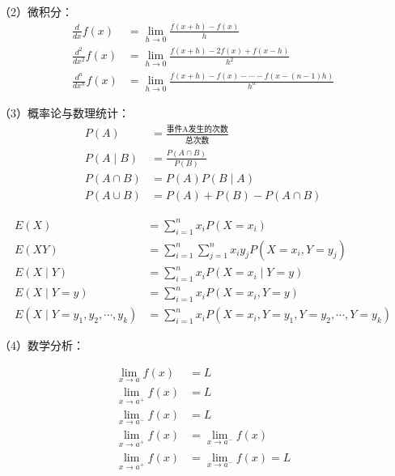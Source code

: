 \begin{ujnbody}
    （2）微积分：
    \begin{equation}
        \begin{split}
            \frac{d}{dx}f(x) &= \lim_{h \to 0}\frac{f(x+h)-f(x)}{h} \\
            \frac{d^2}{dx^2}f(x) &= \lim_{h \to 0}\frac{f(x+h)-2f(x)+f(x-h)}{h^2} \\
            \frac{d^n}{dx^n}f(x) &= \lim_{h \to 0}\frac{f(x+h)-f(x)-\cdots-f(x-(n-1)h)}{h^n}
        \end{split}
        \label{eq:1}
    \end{equation}

    （3）概率论与数理统计：
    \begin{equation}
        \begin{split}
            P(A) &= \frac{\text{事件A发生的次数}}{\text{总次数}} \\
            P(A \mid B) &= \frac{P(A \cap B)}{P(B)} \\
            P(A \cap B) &= P(A)P(B \mid A) \\
            P(A \cup B) &= P(A) + P(B) - P(A \cap B)
        \end{split}
    \end{equation}

    \begin{equation}
        \begin{split}
            E(X) &= \sum_{i=1}^n x_iP(X=x_i) \\
            E(XY) &= \sum_{i=1}^n \sum_{j=1}^n x_iy_jP(X=x_i,Y=y_j) \\
            E(X \mid Y) &= \sum_{i=1}^n x_iP(X=x_i \mid Y=y) \\
            E(X \mid Y=y) &= \sum_{i=1}^n x_iP(X=x_i,Y=y) \\
            E(X \mid Y=y_1,y_2,\cdots,y_k) &= \sum_{i=1}^n x_iP(X=x_i,Y=y_1,Y=y_2,\cdots,Y=y_k)
        \end{split}
    \end{equation}

    （4）数学分析：

    \begin{equation}
        \begin{split}
            \lim_{x \to a}f(x) &= L \\
            \lim_{x \to a^+}f(x) &= L \\
            \lim_{x \to a^-}f(x) &= L \\
            \lim_{x \to a^+}f(x) &= \lim_{x \to a^-}f(x) \\
            \lim_{x \to a^+}f(x) &= \lim_{x \to a^-}f(x) = L
        \end{split}
    \end{equation}


\end{ujnbody}
